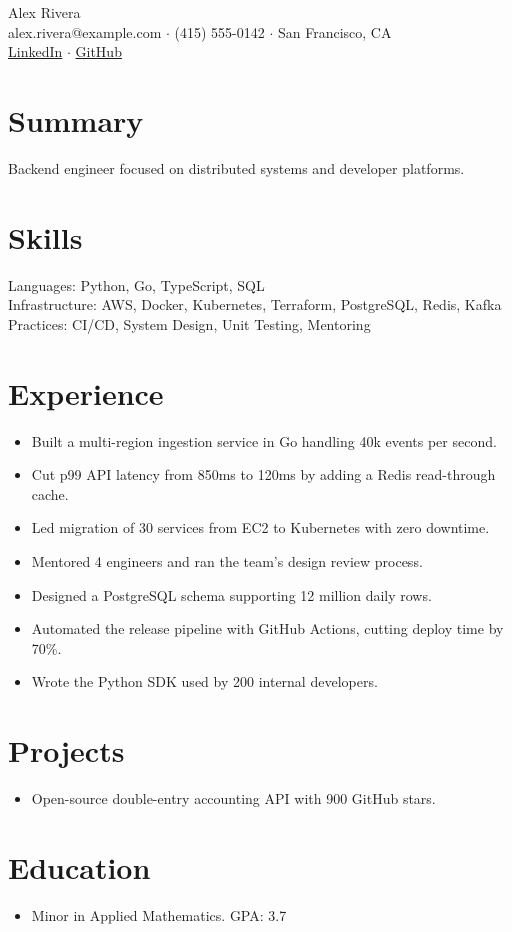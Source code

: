 \documentclass[10pt]{article}
\begin{document}
{\Huge Alex Rivera}\\
alex.rivera@example.com $\cdot$ (415) 555-0142 $\cdot$ San Francisco, CA\\
\href{https://linkedin.com/in/alexrivera}{LinkedIn} $\cdot$ \href{https://github.com/alexrivera}{GitHub}

\section{Summary}
Backend engineer focused on distributed systems and developer platforms.

\section{Skills}
Languages: Python, Go, TypeScript, SQL\\
Infrastructure: AWS, Docker, Kubernetes, Terraform, PostgreSQL, Redis, Kafka\\
Practices: CI/CD, System Design, Unit Testing, Mentoring

\section{Experience}
\begin{itemize}
  \item Built a multi-region ingestion service in Go handling 40k events per second.
  \item Cut p99 API latency from 850ms to 120ms by adding a Redis read-through cache.
  \item Led migration of 30 services from EC2 to Kubernetes with zero downtime.
  \item Mentored 4 engineers and ran the team's design review process.
\end{itemize}

\begin{itemize}
  \item Designed a PostgreSQL schema supporting 12 million daily rows.
  \item Automated the release pipeline with GitHub Actions, cutting deploy time by 70\%.
  \item Wrote the Python SDK used by 200 internal developers.
\end{itemize}

\section{Projects}
\begin{itemize}
  \item Open-source double-entry accounting API with 900 GitHub stars.
\end{itemize}

\section{Education}
\begin{itemize}
  \item Minor in Applied Mathematics. GPA: 3.7
\end{itemize}
\end{document}
